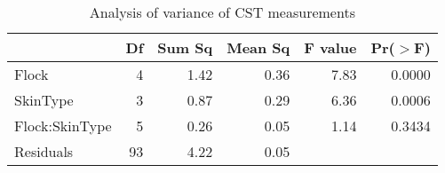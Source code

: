 \begin{table}[ht]
\centering
\caption{Analysis of variance of CST measurements}
\label{tab:cstaov}
\begin{tabular}{lrrrrr}
  \hline
 & Df & Sum Sq & Mean Sq & F value & Pr($>$F) \\ 
  \hline
Flock          & 4 & 1.42 & 0.36 & 7.83 & 0.0000 \\ 
  SkinType       & 3 & 0.87 & 0.29 & 6.36 & 0.0006 \\ 
  Flock:SkinType & 5 & 0.26 & 0.05 & 1.14 & 0.3434 \\ 
  Residuals      & 93 & 4.22 & 0.05 &  &  \\ 
   \hline
\end{tabular}
\end{table}

